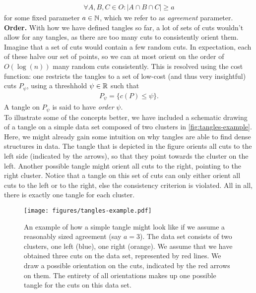 \begin{align}
    \forall A,B,C \in O: \left| A \cap B \cap C \right| \ge a
\end{align}
for some fixed parameter $a \in \mathbb{N}$, which we refer to as \textit{agreement} parameter. \\

\noindent
\textbf{Order.} With how we have defined tangles so far, a lot of sets of cuts wouldn't allow for any tangles, as there are too many cuts to consistently orient them. 
Imagine that a set of cuts would contain a few random cuts. 
In expectation, each of these halve our set of points, so we can at most orient on the order of $O(\log(n))$ many random cuts consistently.
This is resolved using the cost function: one restricts the tangles to a set of low-cost (and thus very insightful) cuts $P_{\psi}$, using a threshhold $\psi \in \mathbb{R}$ such that
\begin{align*}
P_{\psi} = \{ c(P) \le \psi \}   
.\end{align*}
A tangle on $P_{\psi}$ is said to have \textit{order} $\psi$. \\

\noindent
To illustrate some of the concepts better, we have included a schematic drawing of a tangle on 
a simple data set composed of two clusters in \autoref{fig:tangles-example}. 
Here, we might already gain some intuition on why tangles are able to find dense structures in data. 
The tangle that is depicted in the figure orients all cuts to the left side 
(indicated by the arrows), so that they point towards the cluster on the left. 
Another possible tangle might orient all cuts to the right, pointing to the right cluster. 
Notice that a tangle on this set of cuts can only either orient all cuts to the left or to the 
right, else the consistency criterion is violated. All in all, 
there is exactly one tangle for each cluster.

\begin{figure}[h]
    \centering
    \texttt{[image: figures/tangles-example.pdf]}
    \caption{An example of how a simple tangle might look like if we assume a reasonably sized agreement (say $a = 3$). 
        The data set consists of two clusters, one left (blue), one right (orange).
        We assume that we have obtained three cuts on the data set, represented 
        by red lines.
        We draw a possible orientation on the cuts, indicated by the red arrows on them. 
        The entirety of all orientations makes up one possible tangle for the cuts 
        on this data set. 
    }
    \label{fig:tangles-example}
\end{figure}

